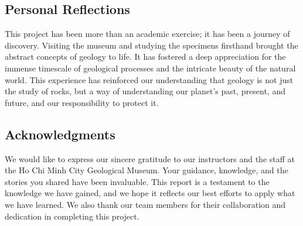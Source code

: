 \subsection{Personal Reflections}
\label{sec:personal_reflections}
This project has been more than an academic exercise; it has been a journey of discovery. Visiting the museum and studying the specimens firsthand brought the abstract concepts of geology to life. It has fostered a deep appreciation for the immense timescale of geological processes and the intricate beauty of the natural world. This experience has reinforced our understanding that geology is not just the study of rocks, but a way of understanding our planet's past, present, and future, and our responsibility to protect it.

\subsection{Acknowledgments}
\label{sec:acknowledgments}
We would like to express our sincere gratitude to our instructors and the staff at the Ho Chi Minh City Geological Museum. Your guidance, knowledge, and the stories you shared have been invaluable. This report is a testament to the knowledge we have gained, and we hope it reflects our best efforts to apply what we have learned. We also thank our team members for their collaboration and dedication in completing this project.